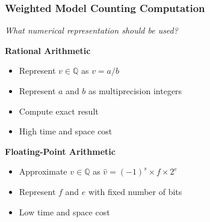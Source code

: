 \documentclass[t,pdf]{beamer}
\newcommand{\bitem}{\item[$\bullet$]}
\newcommand{\approximate}[1]{\hat{#1}}
\newcommand{\approxv}{\approximate{v}}
\begin{document}
\begin{frame}
  \frametitle{Weighted Model Counting Computation}

\begin{center}
  \Large \emph{What numerical representation should be used?}
\end{center}

\bigskip
\begin{minipage}[t]{0.48\textwidth}
{\bf Rational Arithmetic}
\begin{itemize}
  \bitem Represent $v \in \mathbb{Q}$ as $v = a/b$
  \bitem Represent $a$ and $b$ as multiprecision integers
  \bitem Compute exact result
  \bitem High time and space cost
\end{itemize}
\end{minipage}
\begin{minipage}[t]{0.48\textwidth}
{\bf Floating-Point Arithmetic}
\begin{itemize}
  \bitem Approximate $v \in \mathbb{Q}$ as $\approxv = (-1)^s \times f \times 2^{e}$
  \bitem Represent $f$ and $e$ with fixed number of bits
  \bitem Low time and space cost
\end{itemize}
\end{minipage}

\bigskip
{}

\end{frame}
\end{document}
